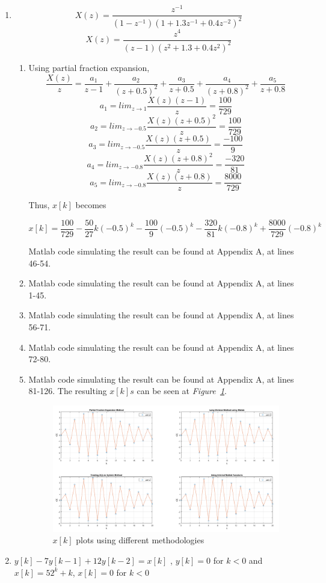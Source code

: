 \documentclass[a4paper,12pt]{article}
\begin{document}
\begin{enumerate}
	
	\item $$ X(z)=\frac{z^{-1}}{(1-z^{-1}){(1+1.3z^{-1}+0.4z^{-2})}^2}$$
		$$ X(z)=\frac{z^{4}}{(z-1){(z^2+1.3+0.4z^2)}^2} $$
				
		\begin{enumerate}
			\item Using partial fraction expansion,
			$$ \frac{X(z)}{z}=\frac{a_1}{z-1}+\frac{a_2}{{(z+0.5)}^2}+\frac{a_3}{z+0.5}+\frac{a_4}{{(z+0.8)}^2}+\frac{a_5}{z+0.8} $$
			$$	a_1=lim_{z \to 1 } \frac{X(z)(z-1)}{z} = \frac{100}{729}	$$
			$$	a_2=lim_{z \to -0.5 } \frac{X(z){(z+0.5)}^2}{z} = \frac{100}{729}	$$
			$$	a_3=lim_{z \to -0.5 } \frac{X(z)(z+0.5)}{z} = \frac{-100}{9}	$$
			$$	a_4=lim_{z \to -0.8 } \frac{X(z){(z+0.8)}^2}{z} = \frac{-320}{81}	$$
			$$	a_5=lim_{z \to -0.8 } \frac{X(z)(z+0.8)}{z} = \frac{8000}{729}	$$
			
			Thus, $x[k]$ becomes
			
			$$\boxed { x[k]=\frac{100}{729}- \frac{50}{27}k{(-0.5)}^k- \frac{100}{9}{(-0.5)}^k- \frac{320}{81}k{(-0.8)}^k+ \frac{8000}{729}{(-0.8)}^k	 }$$
			
			Matlab code simulating the result can be found at Appendix A, at lines 46-54.
			\item Matlab code simulating the result can be found at Appendix A, at lines 1-45.
			\item Matlab code simulating the result can be found at Appendix A, at lines 56-71.
			\item Matlab code simulating the result can be found at Appendix A, at lines 72-80.
			\item Matlab code simulating the result can be found at Appendix A, at lines 81-126. The resulting $x[k]s$ can be seen at \textit{Figure~\ref{fig:method}}.
				\begin{figure}[H]
					\center
					\setlength{\unitlength}{\textwidth} 
					\includegraphics[width=1.0\unitlength]{2e6}
					\caption{\label{fig:method}$x[k]$ plots using different methodologies }
				\end{figure}
		\end{enumerate}
	\item $ y[k]-7y[k-1]+12y[k-2]=x[k]$ , $y[k]=0$ for $k<0$ and $x[k]=52^k+k$, $x[k]=0$ for $k<0$ 
		

\end{enumerate}
\end{document}
